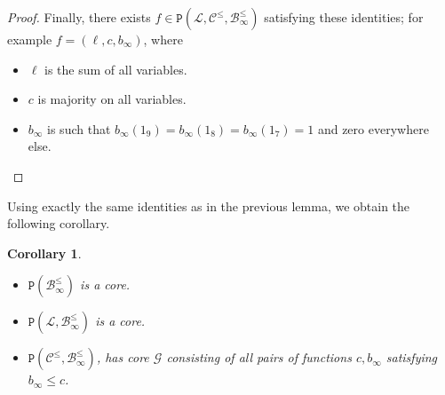 \documentclass{amsart}
\numberwithin{equation}{section}
\theoremstyle{plain}
\newtheorem{corollary}[theorem]{Corollary}
\theoremstyle{definition}
\def\clone#1{\mathcal{#1}}
\def\minion#1{\mathcal{#1}}
\def\Bc{\clone{B}}
\def\Lc{\clone{L}}
\def\Cc{\clone{C}}
\def\C#1{{\mathtt{P}}(#1)}
\begin{document}
\begin{proof}
Finally, there exists $f\in\C{\Lc,\Cc^\leq,\Bc_\infty^\leq}$ satisfying these identities; for example $f=(\ell,c,b_\infty)$, where
\begin{itemize}
\item $\ell$ is the sum of all variables.
\item $c$ is majority on all variables.
\item $b_\infty$ is such that $b_\infty(1_9)=b_\infty(1_8)=b_\infty(1_7)=1$ and zero everywhere else.
\end{itemize}
\end{proof}

Using exactly the same identities as in the previous lemma, we obtain
the following corollary.

\begin{corollary}\label{lcleqbleqinfcor}
  \hfill
    \begin{itemize}
        \item $\C{\Bc^\leq_\infty}$ is a core.
        \item $\C{\Lc,\Bc^\leq_\infty}$ is a core.
        \item $\C{\Cc^\leq,\Bc^\leq_\infty}$, has core $\minion{G}$ consisting of all pairs of functions $c, b_\infty$ satisfying $b_\infty\leq c$.
    \end{itemize}
\end{corollary}
\end{document}

